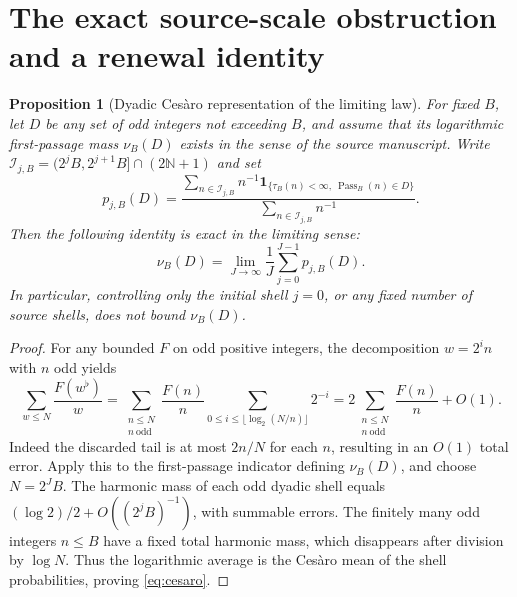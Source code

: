 \documentclass[11pt]{amsart}
\newtheorem{proposition}{Proposition}
\theoremstyle{remark}\newtheorem{remark}{Remark}
\newcommand{\N}{\mathbb N}
\newcommand{\Pass}{\operatorname{Pass}}
\begin{document}
\section{The exact source-scale obstruction and a renewal identity}
\begin{proposition}[Dyadic Ces\`aro representation of the limiting law]\label{prop:cesaro}
For fixed $B$, let $D$ be any set of odd integers not exceeding $B$, and assume that its logarithmic first-passage mass $\nu_B(D)$ exists in the sense of the source manuscript.  Write $\mathcal I_{j,B}=(2^jB,2^{j+1}B]\cap(2\N+1)$ and set
\[
 p_{j,B}(D)=\frac{\displaystyle\sum_{n\in\mathcal I_{j,B}}n^{-1}\mathbf1_{\{\tau_B(n)<\infty,\ \Pass_B(n)\in D\}}}
 {\displaystyle\sum_{n\in\mathcal I_{j,B}}n^{-1}}.
\]
Then the following identity is exact in the limiting sense:
\begin{equation}\label{eq:cesaro}
 \boxed{\nu_B(D)=\lim_{J\to\infty}\frac1J\sum_{j=0}^{J-1}p_{j,B}(D).}
\end{equation}
In particular, controlling only the initial shell $j=0$, or any fixed number of source shells, does not bound $\nu_B(D)$.
\end{proposition}
\begin{proof}
For any bounded $F$ on odd positive integers, the decomposition $w=2^in$ with $n$ odd yields
\[
 \sum_{w\le N}\frac{F(w^{\flat})}{w}
 =\sum_{\substack{n\le N\\n\ \mathrm{odd}}}\frac{F(n)}n
 \sum_{0\le i\le\lfloor\log_2(N/n)\rfloor}2^{-i}
 =2\sum_{\substack{n\le N\\n\ \mathrm{odd}}}\frac{F(n)}n+O(1).
\]
Indeed the discarded tail is at most $2n/N$ for each $n$, resulting in an $O(1)$ total error.  Apply this to the first-passage indicator defining $\nu_B(D)$, and choose $N=2^JB$. The harmonic mass of each odd dyadic shell equals $(\log2)/2+O((2^jB)^{-1})$, with summable errors.  The finitely many odd integers $n\le B$ have a fixed total harmonic mass, which disappears after division by $\log N$.  Thus the logarithmic average is the Ces\`aro mean of the shell probabilities, proving \eqref{eq:cesaro}.
\end{proof}
\end{document}
